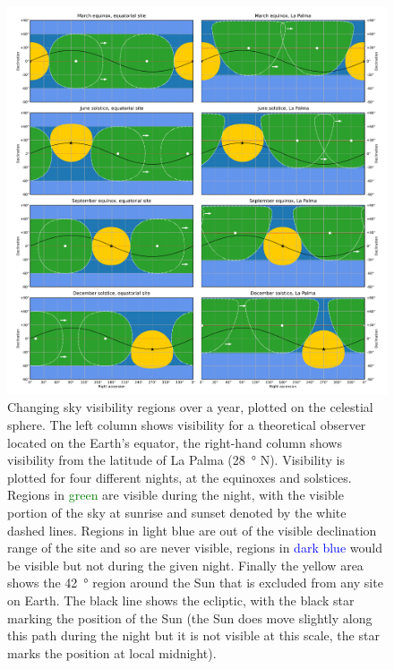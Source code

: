 \begin{colsection}
\begin{colsection}
\begin{figure}[p]
    \begin{center}
        \includegraphics[width=\linewidth]{images/visibility.pdf}
    \end{center}
    \caption[Plotting sky visibility regions over a year]{
        Changing sky visibility regions over a year, plotted on the celestial sphere. The left column shows visibility for a theoretical observer located on the Earth's equator, the right-hand column shows visibility from the latitude of La Palma (\SI{28}{\degree} N). Visibility is plotted for four different nights, at the equinoxes and solstices. Regions in \textcolor{Green}{green} are visible during the night, with the visible portion of the sky at sunrise and sunset denoted by the white dashed lines. Regions in \textcolor{NavyBlue}{light blue} are out of the visible declination range of the site and so are never visible, regions in \textcolor{Blue}{dark blue} would be visible but not during the given night. Finally the \textcolor{BurntOrange}{yellow} area shows the \SI{42}{\degree} region around the Sun that is excluded from any site on Earth. The black line shows the ecliptic, with the black star marking the position of the Sun (the Sun does move slightly along this path during the night but it is not visible at this scale, the star marks the position at local midnight).
    }\label{fig:visibility}
\end{figure}


\end{colsection}
\end{colsection}
